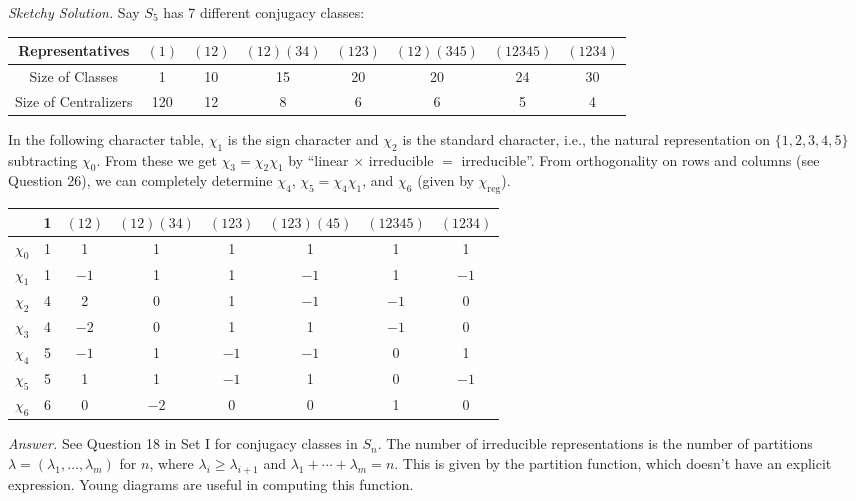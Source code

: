 \documentclass{mathproblems}
\begin{document}
\begin{questions}
\textit{Sketchy Solution.} Say $S_5$ has 7 different conjugacy classes:
\begin{center}
\begin{tabular}{c|ccccccc}
Representatives & $(1)$ & $(12)$ & $(12)(34)$ & $(123)$ & $(12)(345)$ & $(12345)$ & $(1234)$ \\
\hline
Size of Classes & 1 & 10 & 15 & 20 & 20 & 24 & 30 \\
Size of Centralizers & 120 & 12 & 8 & 6 & 6 & 5 & 4
\end{tabular}
\end{center}
In the following character table, $\chi_1$ is the sign character and $\chi_2$ is the standard character, i.e., the natural representation on $\{1,2,3,4,5\}$ subtracting $\chi_0$. From these we get $\chi_3=\chi_2\chi_1$ by ``linear $\times$ irreducible $=$ irreducible''. From orthogonality on rows and columns (see Question 26), we can completely determine $\chi_4$, $\chi_5=\chi_4\chi_1$, and $\chi_6$ (given by $\chi_{\operatorname{reg}}$).
\begin{center}
\begin{tabular}{c|ccccccc} 
& 1 & $(12)$ & $(12)(34)$ & $(123)$ & $(123)(45)$ & $(12345)$ & $(1234)$ \\
\hline$\chi_{0}$ & 1 & 1 & 1 & 1 & 1 & 1 & 1 \\
$\chi_{1}$ & 1 & $-1$ & 1 & 1 & $-1$ & 1 & $-1$ \\
$\chi_{2}$ & 4 & 2 & 0 & 1 & $-1$ & $-1$ & 0 \\
$\chi_{3}$ & 4 & $-2$ & 0 & 1 & 1 & $-1$ & 0 \\
$\chi_{4}$ & 5 & $-1$ & 1 & $-1$ & $-1$ & 0 & 1 \\
$\chi_{5}$ & 5 & 1 & 1 & $-1$ & 1 & 0 & $-1$ \\
$\chi_{6}$ & 6 & 0 & $-2$ & 0 & 0 & 1 & 0
\end{tabular}
\end{center}


\textit{Answer.} See Question 18 in Set I for conjugacy classes in $S_n$. The number of irreducible representations is the number of partitions $\lambda=(\lambda_1,\ldots,\lambda_m)$ for $n$, where $\lambda_i\geq \lambda_{i+1}$ and $\lambda_1+\cdots+\lambda_m=n$. This is given by the partition function, which doesn't have an explicit expression. Young diagrams are useful in computing this function.


\end{questions}
\end{document}
